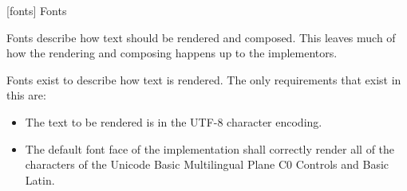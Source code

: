 
 [fonts] {Fonts}

\pnum
Fonts describe how text should be rendered and composed. This \documenttypename{} leaves much of how the rendering and composing happens up to the implementors.

\pnum
Fonts exist to describe how text is rendered. The only requirements that exist in this \documenttypename{} are:
\begin{itemize}
\item The text to be rendered is in the UTF-8 character encoding.
\item The default font face of the implementation shall correctly render all of the characters of the Unicode Basic Multilingual Plane C0 Controls and Basic Latin.
\end{itemize}

\addtocounter{SectionDepthBase}{1}








\addtocounter{SectionDepthBase}{-1}
